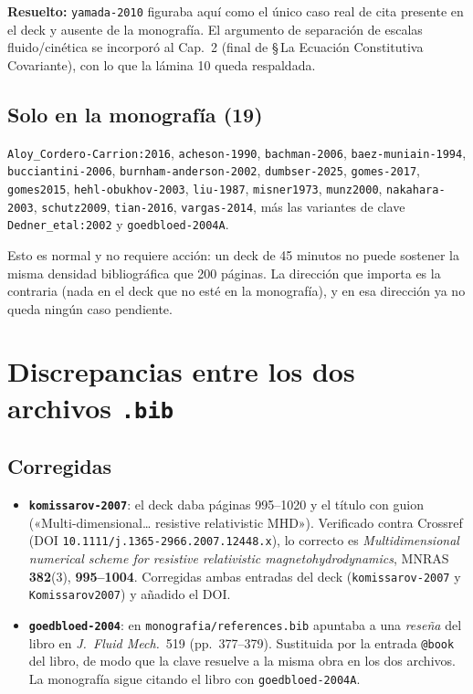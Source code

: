 \documentclass[11pt,openany]{report}
\newcommand{\clave}[1]{\texttt{\small #1}}
\begin{document}
\noindent\textcolor{verdeok}{\textbf{Resuelto:}} \clave{yamada-2010} figuraba aquí como
el único caso real de cita presente en el deck y ausente de la monografía. El argumento
de separación de escalas fluido/cinética se incorporó al Cap.~2 (final de
§\,La Ecuación Constitutiva Covariante), con lo que la lámina 10 queda respaldada.

\subsection*{Solo en la monografía (19)}
\clave{Aloy\_Cordero-Carrion:2016}, \clave{acheson-1990}, \clave{bachman-2006},
\clave{baez-muniain-1994}, \clave{bucciantini-2006}, \clave{burnham-anderson-2002},
\clave{dumbser-2025}, \clave{gomes-2017}, \clave{gomes2015}, \clave{hehl-obukhov-2003},
\clave{liu-1987}, \clave{misner1973}, \clave{munz2000}, \clave{nakahara-2003},
\clave{schutz2009}, \clave{tian-2016}, \clave{vargas-2014}, más las variantes de clave
\clave{Dedner\_etal:2002} y \clave{goedbloed-2004A}.

Esto es normal y no requiere acción: un deck de 45 minutos no puede
sostener la misma densidad bibliográfica que 200 páginas. La dirección
que importa es la contraria (nada en el deck que no esté en la
monografía), y en esa dirección ya no queda ningún caso pendiente.

\section{Discrepancias entre los dos archivos \texttt{.bib}}

\subsection*{Corregidas}
\begin{itemize}
  \item \textcolor{verdeok}{\textbf{\clave{komissarov-2007}}}: el deck daba páginas
        995--1020 y el título con guion («Multi-dimensional\ldots{} resistive relativistic
        MHD»). Verificado contra Crossref (DOI \texttt{10.1111/j.1365-2966.2007.12448.x}),
        lo correcto es \textit{Multidimensional numerical scheme for resistive relativistic
        magnetohydrodynamics}, MNRAS \textbf{382}(3), \textbf{995--1004}. Corregidas ambas
        entradas del deck (\clave{komissarov-2007} y \clave{Komissarov2007}) y añadido el DOI.
  \item \textcolor{verdeok}{\textbf{\clave{goedbloed-2004}}}: en
        \texttt{monografia/references.bib} apuntaba a una \emph{reseña} del libro en
        \textit{J.~Fluid Mech.}~519 (pp.~377--379). Sustituida por la entrada
        \texttt{@book} del libro, de modo que la clave resuelve a la misma obra en los
        dos archivos. La monografía sigue citando el libro con \clave{goedbloed-2004A}.
\end{itemize}
\end{document}
